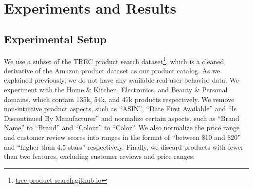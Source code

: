 \section{Experiments and Results}
\subsection{Experimental Setup}
\label{sec:setup}

We use a subset of the TREC product search dataset\footnote{\url{trec-product-search.github.io}}, which is a cleaned derivative of the Amazon product dataset \cite{mcauley2015image} as our product catalog. As we explained previously, we do not have any available real-user behavior data. We experiment with the Home \& Kitchen, Electronics, and Beauty \& Personal domains, which contain 135k, 54k, and 47k products respectively. 
We remove non-intuitive product aspects, such as ``ASIN'', ``Date First Available'' and ``Is Discontinued By Manufacturer'' and normalize certain aspects, such as ``Brand Name'' to ``Brand'' and ``Colour'' to ``Color''. 
We also normalize the price range and customer review scores into ranges in the format of ``between \$10 and \$20'' and ``higher than 4.5 stars'' respectively. Finally, we discard products with fewer than two features, excluding customer reviews and price ranges.%



